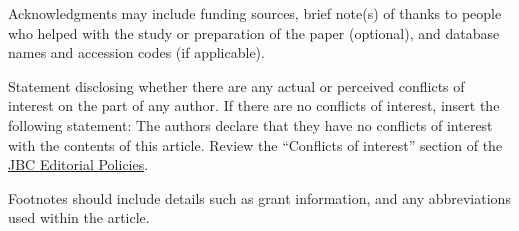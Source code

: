 \documentclass{jbc-article}
\begin{document}
\begin{acknowledgments}
Acknowledgments may include funding sources, brief note(s) of thanks to people who helped with the study or preparation of the paper (optional), and database names and accession codes (if applicable). 
\end{acknowledgments}

\begin{conflict}
Statement disclosing whether there are any actual or perceived conflicts of interest on the part of any author. If there are no conflicts of interest, insert the following statement: The authors declare that they have no conflicts of interest with the contents of this article. Review the “Conflicts of interest” section of the \href{http://www.jbc.org/site/misc/edpolicy.xhtml}{JBC Editorial Policies}.
\end{conflict}




\begin{footnotes}
Footnotes should include details such as grant information, and any abbreviations used within the article.
\end{footnotes}
\end{document}
